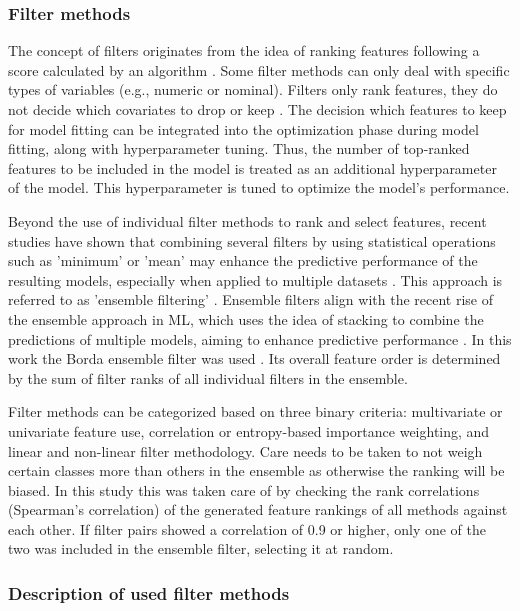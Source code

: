 \documentclass[remotesensing,article,submit,moreauthors,pdftex]{Definitions/mdpi}
\begin{document}
\subsubsection{Filter methods}

The concept of filters originates from the idea of ranking features following a score calculated by an algorithm \cite{guyon2003}.
Some filter methods can only deal with specific types of variables (e.g., numeric or nominal).
Filters only rank features, they do not decide which covariates to drop or keep \cite{drotar2015}.
The decision which features to keep for model fitting can be integrated into the optimization phase during model fitting, along with hyperparameter tuning.
Thus, the number of top-ranked features to be included in the model is treated as an additional hyperparameter of the model.
This hyperparameter is tuned to optimize the model's performance.

Beyond the use of individual filter methods to rank and select features, recent studies have shown that combining several filters by using statistical operations such as 'minimum' or 'mean' may enhance the predictive performance of the resulting models, especially when applied to multiple datasets \cite{abeel2010, drotar2017}.
This approach is referred to as 'ensemble filtering' \cite{dietterich2000}.
Ensemble filters align with the recent rise of the ensemble approach in ML, which uses the idea of stacking to combine the predictions of multiple models, aiming to enhance predictive performance \cite{polikar2012, feurer2015, bolon-canedo2019}.
In this work the Borda ensemble filter was used \cite{drotar2017}.
Its overall feature order is determined by the sum of filter ranks of all individual filters in the ensemble.

Filter methods can be categorized based on three binary criteria: multivariate or univariate feature use, correlation or entropy-based importance weighting, and linear and non-linear filter methodology.
Care needs to be taken to not weigh certain classes more than others in the ensemble as otherwise the ranking will be biased.
In this study this was taken care of by checking the rank correlations (Spearman's correlation) of the generated feature rankings of all methods against each other.
If filter pairs showed a correlation of 0.9 or higher, only one of the two was included in the ensemble filter, selecting it at random.

\subsubsection{Description of used filter methods}
\end{document}
